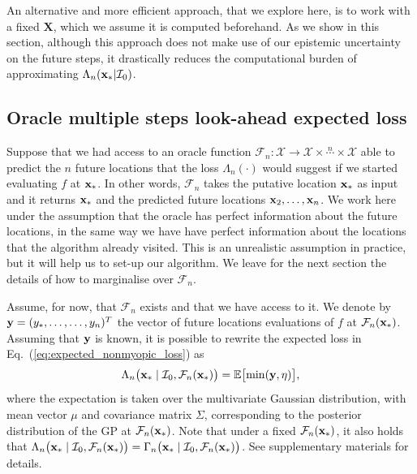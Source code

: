 \documentclass[twoside]{article}
\newcommand{\I}{\mathcal{I}}
\newcommand{\E}{\mathbb{E}}
\newcommand{\future}{\mathcal{F}}
\begin{document}
An alternative and more efficient approach, that we explore here, is to work with a fixed $\textbf{X}$, which we assume it is computed beforehand. As we show in this section, although this approach does not make use of our epistemic uncertainty on the future steps, it drastically reduces the computational burden of approximating $\Lambda_n(\latentVector_*|\I_0 )$. 



\subsection{Oracle multiple steps look-ahead expected loss}



Suppose that  we had access to an oracle function $\future_{n}: {\mathcal X}\rightarrow  {\mathcal X}\times \overset{n}{\cdots}\times {\mathcal X}$ able to predict the $n$ future  locations that the loss $\Lambda_n(\cdot)$ would suggest if we started evaluating $f$ at $\mathbf{x}_*$. In other words, $\future_{n}$ takes the putative location $\mathbf{x}_*$ as input and it returns $\mathbf{x}_*$ and the predicted future locations  $\mathbf{x}_2,\dots, \mathbf{x}_n$. We work here under the assumption that the oracle has perfect information about the future locations, in the same way we have have perfect information about the locations that the algorithm already visited. This is an unrealistic assumption in practice, but it will help us to set-up our algorithm. We leave for the next section the details of how to marginalise over $\future_{n}$. 

Assume, for now, that $\future_{n}$ exists and that we have access to it. We  denote by $\mathbf{y}=(y_*,\dots,\dots,y_n)^T$ the vector of future locations evaluations of $f$ at $\future_n(\latentVector_*)$. Assuming that $\mathbf{y}$ is known, it is possible to rewrite the expected loss in Eq.~(\ref{eq:expected_nonmyopic_loss}) as
\begin{equation}\label{eq:oracle_expected_nonmyopic_loss}
\Lambda_n \bigl(\latentVector_* \mid \I_0, \future_{n}(\latentVector_*) \bigr) = \E \bigl[\min (\dataVector,\eta) \bigr], 
\end{equation}
where the expectation is taken over the multivariate Gaussian distribution, with mean vector $\mu$ and covariance matrix $\Sigma$, corresponding to the posterior distribution of the GP at $\future_{n}(\latentVector_*)$. Note that under a fixed $\future_{n}(\latentVector_*)$, it also holds that 
$
\Lambda_n \bigl(\latentVector_* \mid \I_0, \future_{n}(\latentVector_*) \bigr) 
= 
\Gamma_n \bigl(\latentVector_* \mid \I_0,\future_{n}(\latentVector_*) \bigr)
$. 
See supplementary materials for details.
\end{document}

